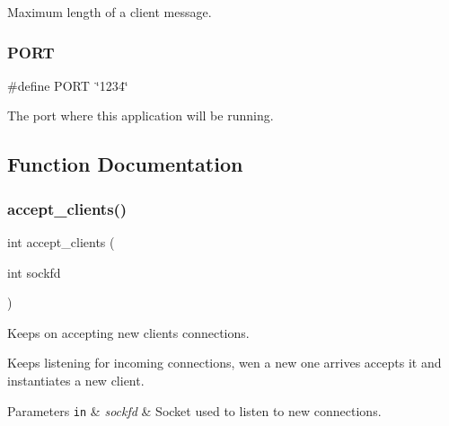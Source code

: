 Maximum length of a client message. 

\mbox{\label{zip-zop-server_8c_a614217d263be1fb1a5f76e2ff7be19a2}} 
\subsubsection{\texorpdfstring{P\+O\+RT}{PORT}}
{\footnotesize\ttfamily \#define P\+O\+RT~\char`\"{}1234\char`\"{}}



The port where this application will be running. 



\subsection{Function Documentation}
\mbox{\label{zip-zop-server_8c_acd1dc66d1afd8edcd165dc3f6855d355}} 
\subsubsection{\texorpdfstring{accept\+\_\+clients()}{accept\_clients()}}
{\footnotesize\ttfamily int accept\+\_\+clients (\begin{DoxyParamCaption}\item[{int}]{sockfd }\end{DoxyParamCaption})}



Keeps on accepting new clients connections. 

Keeps listening for incoming connections, wen a new one arrives accepts it and instantiates a new client.


\begin{DoxyParams}[1]{Parameters}
\mbox{\tt in}  & {\em sockfd} & Socket used to listen to new connections. \\
\hline
\end{DoxyParams}
\mbox{\label{zip-zop-server_8c_a3608e5c14908c59afe16bf1fc85895c9}} 
